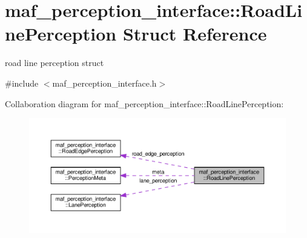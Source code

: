 \hypertarget{structmaf__perception__interface_1_1RoadLinePerception}{}\section{maf\+\_\+perception\+\_\+interface\+:\+:Road\+Line\+Perception Struct Reference}
\label{structmaf__perception__interface_1_1RoadLinePerception}


road line perception struct  




{\ttfamily \#include $<$maf\+\_\+perception\+\_\+interface.\+h$>$}



Collaboration diagram for maf\+\_\+perception\+\_\+interface\+:\+:Road\+Line\+Perception\+:\nopagebreak
\begin{figure}[H]
\begin{center}
\leavevmode
\includegraphics[width=350pt]{structmaf__perception__interface_1_1RoadLinePerception__coll__graph}
\end{center}
\end{figure}
